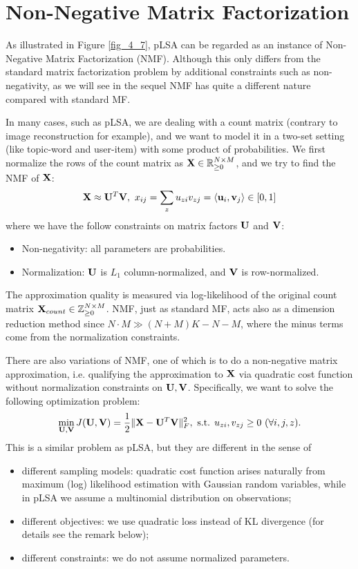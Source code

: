 \documentclass[../book-template.tex]{subfiles}
\begin{document}
\section{Non-Negative Matrix Factorization}
As illustrated in Figure \ref{fig_4_7}, pLSA can be regarded as an instance of Non-Negative Matrix Factorization (NMF). Although this only differs from the standard matrix factorization problem by additional constraints such as non-negativity, as we will see in the sequel NMF has quite a different nature compared with standard MF.
\par In many cases, such as pLSA, we are dealing with a count matrix (contrary to image reconstruction for example), and we want to model it in a two-set setting (like topic-word and user-item) with some product of probabilities. We first normalize the rows of the count matrix as ${\bf X}\in \mathbb{R}^{N\times M}_{\geq 0}$, and we try to find the NMF of ${\bf X}$:
\begin{equation*}
	{\bf X}\approx {\bf U}^T{\bf V},\ x_{ij}=\sum_{z}u_{zi}v_{zj}=\langle{\bf u}_i,{\bf v}_j\rangle\in [0,1]
\end{equation*}
where we have the follow constraints on matrix factors ${\bf U}$ and ${\bf V}$:
\begin{itemize}
	\item Non-negativity: all parameters are probabilities.
	\item Normalization: ${\bf U}$ is $L_1$ column-normalized, and ${\bf V}$ is row-normalized.
\end{itemize}
The approximation quality is measured via log-likelihood of the original count matrix ${\bf X}_{count}\in \mathbb{Z}^{N\times M}_{\geq 0}$. NMF, just as standard MF, acts also as a dimension reduction method since $N\cdot M\gg (N+M)K-N-M$, where the minus terms come from the normalization constraints.
\par There are also variations of NMF, one of which is to do a non-negative matrix approximation, i.e. qualifying the approximation to ${\bf X}$ via quadratic cost function without normalization constraints on ${\bf U,V}$. Specifically, we want to solve the following optimization problem:
\begin{equation}\label{eq_4_NMF_q_obj}
	\min_{{\bf U,V}}J({\bf U,V})=\frac{1}{2}\|{\bf X}-{\bf U}^T{\bf V}\|_F^2,\ \text{s.t. } u_{zi},v_{zj}\geq 0\ (\forall i,j,z).
\end{equation}
This is a similar problem as pLSA, but they are different in the sense of
\begin{itemize}
	\item different sampling models: quadratic cost function arises naturally from maximum (log) likelihood estimation with Gaussian random variables, while in pLSA we assume a multinomial distribution on observations;
	\item different objectives: we use quadratic loss instead of KL divergence (for details see the remark below);
	\item different constraints: we do not assume normalized parameters.
\end{itemize}
\end{document}
